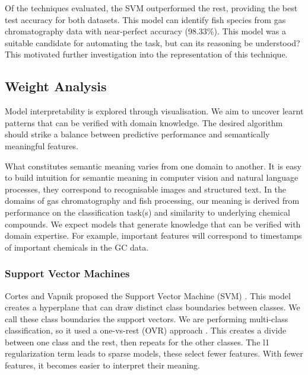 \documentclass[runningheads]{llncs}
\begin{document}
Of the techniques evaluated, the SVM outperformed the rest, providing the best test accuracy for both datasets. 
This model can identify fish species from gas chromatography data with near-perfect accuracy (98.33\%).
This model was a suitable candidate for automating the task, but can its reasoning be understood? 
This motivated further investigation into the representation of this technique.

\subsection{Weight Analysis}


Model interpretability is explored through visualisation.
We aim to uncover learnt patterns that can be verified with domain knowledge.
The desired algorithm should strike a balance between predictive performance and semantically meaningful features.

What constitutes semantic meaning varies from one domain to another.
It is easy to build intuition for semantic meaning in computer vision and natural language processes, they correspond to recognisable images and structured text.
In the domains of gas chromatography and fish processing, our meaning is derived from performance on the classification task(s) and similarity to underlying chemical compounds.
We expect models that generate knowledge that can be verified with domain expertise. 
For example, important features will correspond to timestamps of important chemicals in the GC data.

\subsubsection{Support Vector Machines}

Cortes and Vapnik proposed the Support Vector Machine (SVM) \cite{cortes1995support}.
This model creates a hyperplane that can draw distinct class boundaries between classes.
We call these class boundaries the support vectors.
We are performing multi-class classification, so it used a one-vs-rest (OVR) approach \cite{sklearn2021feature}.
This creates a divide between one class and the rest, then repeats for the other classes.
The l1 regularization term leads to sparse models, these select fewer features. 
With fewer features, it becomes easier to interpret their meaning. 
\end{document}
